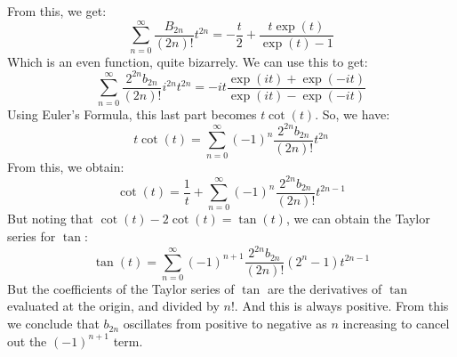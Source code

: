 \documentclass[crop=false,class=book,oneside]{standalone}
\begin{document}
            From this, we get:
            \begin{equation}
                \sum_{n=0}^{\infty}\frac{B_{2n}}{(2n)!}t^{2n}
                =-\frac{t}{2}+\frac{t\exp(t)}{\exp(t)-1}
            \end{equation}
            Which is an even function, quite bizarrely.
            We can use this to get:
            \begin{equation}
                \sum_{n=0}^{\infty}
                \frac{2^{2n}b_{2n}}{(2n)!}i^{2n}t^{2n}
                =-it\frac{\exp(it)+\exp(-it)}{\exp(it)-\exp(-it)}
            \end{equation}
            Using Euler's Formula, this last part becomes
            $t\cot(t)$. So, we have:
            \begin{equation}
                t\cot(t)=\sum_{n=0}^{\infty}
                (-1)^{n}\frac{2^{2n}b_{2n}}{(2n)!}t^{2n}
            \end{equation}
            From this, we obtain:
            \begin{equation}
                \cot(t)=\frac{1}{t}+\sum_{n=0}^{\infty}
                (-1)^{n}\frac{2^{2n}b_{2n}}{(2n)!}t^{2n-1}
            \end{equation}
            But noting that $\cot(t)-2\cot(t)=\tan(t)$, we can
            obtain the Taylor series for $\tan$:
            \begin{equation}
                \tan(t)=\sum_{n=0}^{\infty}
                (-1)^{n+1}\frac{2^{2n}b_{2n}}{(2n)!}(2^{n}-1)t^{2n-1}
            \end{equation}
            But the coefficients of the Taylor series of $\tan$
            are the derivatives of $\tan$ evaluated at the origin,
            and divided by $n!$. And this is always positive. From
            this we conclude that $b_{2n}$ oscillates from positive
            to negative as $n$ increasing to cancel out the
            $(-1)^{n+1}$ term.
\end{document}
